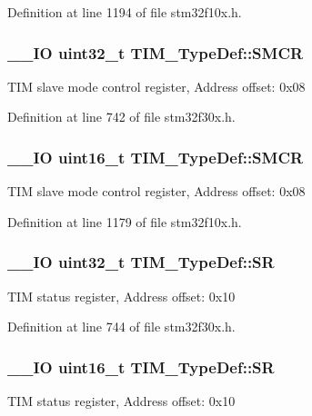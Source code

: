 Definition at line 1194 of file stm32f10x.\-h.

\hypertarget{struct_t_i_m___type_def_a67d30593bcb68b98186ebe5bc8dc34b1}{
\subsubsection[{S\-M\-C\-R}]{\setlength{\rightskip}{0pt plus 5cm}\-\_\-\-\_\-\-I\-O {\bf uint32\-\_\-t} T\-I\-M\-\_\-\-Type\-Def\-::\-S\-M\-C\-R}}\label{struct_t_i_m___type_def_a67d30593bcb68b98186ebe5bc8dc34b1}
T\-I\-M slave mode control register, Address offset\-: 0x08 

Definition at line 742 of file stm32f30x.\-h.

\hypertarget{struct_t_i_m___type_def_a476012f1b4567ffc21ded0b5fd50985e}{
\subsubsection[{S\-M\-C\-R}]{\setlength{\rightskip}{0pt plus 5cm}\-\_\-\-\_\-\-I\-O {\bf uint16\-\_\-t} T\-I\-M\-\_\-\-Type\-Def\-::\-S\-M\-C\-R}}\label{struct_t_i_m___type_def_a476012f1b4567ffc21ded0b5fd50985e}
T\-I\-M slave mode control register, Address offset\-: 0x08 

Definition at line 1179 of file stm32f10x.\-h.

\hypertarget{struct_t_i_m___type_def_acedfc978c879835c05ef1788ad26b2ff}{
\subsubsection[{S\-R}]{\setlength{\rightskip}{0pt plus 5cm}\-\_\-\-\_\-\-I\-O {\bf uint32\-\_\-t} T\-I\-M\-\_\-\-Type\-Def\-::\-S\-R}}\label{struct_t_i_m___type_def_acedfc978c879835c05ef1788ad26b2ff}
T\-I\-M status register, Address offset\-: 0x10 

Definition at line 744 of file stm32f30x.\-h.

\hypertarget{struct_t_i_m___type_def_af686e22c1792dc59dfeffe451d47cf13}{
\subsubsection[{S\-R}]{\setlength{\rightskip}{0pt plus 5cm}\-\_\-\-\_\-\-I\-O {\bf uint16\-\_\-t} T\-I\-M\-\_\-\-Type\-Def\-::\-S\-R}}\label{struct_t_i_m___type_def_af686e22c1792dc59dfeffe451d47cf13}
T\-I\-M status register, Address offset\-: 0x10 

